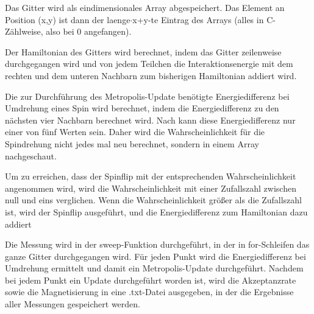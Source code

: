	
	Das Gitter wird als eindimensionales Array abgespeichert. Das Element an Position (x,y) ist dann der laenge$\cdot$x+y-te Eintrag des Arrays (alles in C-Zählweise, also bei 0 angefangen).

	Der Hamiltonian des Gitters wird berechnet, indem das Gitter zeilenweise durchgegangen wird und von jedem Teilchen die Interaktionsenergie mit dem rechten und dem unteren Nachbarn zum bisherigen Hamiltonian addiert wird.
	
	Die zur Durchführung des Metropolis-Update benötigte Energiedifferenz bei Umdrehung eines Spin wird berechnet, indem die Energiedifferenz zu den nächsten vier Nachbarn berechnet wird. 
	Nach \cite[S. 103]{binderheermann} kann diese Energiedifferenz nur einer von fünf Werten sein. Daher wird die Wahrscheinlichkeit für die Spindrehung nicht jedes mal neu berechnet, sondern in einem Array nachgeschaut.
	
	Um zu erreichen, dass der Spinflip mit der entsprechenden Wahrscheinlichkeit angenommen wird, wird die Wahrscheinlichkeit mit einer Zufallszahl zwischen null und eins verglichen\cite[nach][]{metropolisupdate}. Wenn die Wahrscheinlichkeit größer als die Zufallszahl ist, wird der Spinflip ausgeführt, und die Energiedifferenz zum Hamiltonian dazu addiert
	
	Die Messung wird in der sweep-Funktion durchgeführt, in der in for-Schleifen das ganze Gitter durchgegangen wird. Für jeden Punkt wird die Energiedifferenz bei Umdrehung ermittelt und damit ein Metropolis-Update durchgeführt. Nachdem bei jedem Punkt ein Update durchgeführt worden ist, wird die Akzeptanzrate sowie die Magnetisierung in eine .txt-Datei ausgegeben, in der die Ergebnisse aller Messungen gespeichert werden.
	
